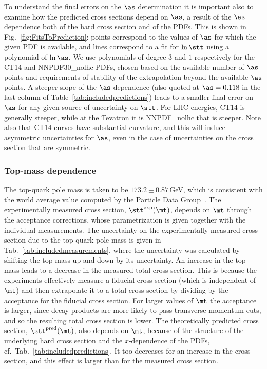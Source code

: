 To understand the final errors on the $\as$ determination it is
important also to examine how the predicted cross sections depend on
$\as$, a result of the $\as$ dependence both of the hard cross section
and of the PDFs.
%
This is shown in Fig.~\ref{fig:FitsToPrediction}: points correspond
to the values of $\as$ for which the given PDF is available, and lines
correspond to a fit for $\ln \stt$ using a polynomial of $\ln \as$. 
%
We use polynomials of degree $3$ and $1$ respectively for the CT14 and
NNPDF30\_nolhc PDFs, chosen based on the available number of $\as$ points and
requirements of stability of the extrapolation beyond the available
$\as$ points.
%
A steeper slope of the $\as$ dependence (also quoted at $\as=0.118$ in
the last column of Table~\ref{tab:includedpredictions})
leads to a smaller final error on $\as$ for any given source of
uncertainty on $\stt$. 
%
For LHC energies, CT14 is generally steeper, while at the Tevatron
it is NNPDF\_nolhc that is steeper.
%
Note also that CT14 curves have substantial curvature, and this will
induce asymmetric uncertainties for $\as$, even in the case of
uncertainties on the cross section that are symmetric.



\subsubsection{Top-mass dependence}
\label{sec:top-mass-dependence}

The top-quark pole mass is taken to be $173.2 \pm 0.87\,$GeV, which
is consistent with the world average value computed by the Particle Data
Group~\cite{pdg}. 
% 
% 
The experimentally measured cross section, $\stt^{\text{exp}} (\mt)$,
depends on $\mt$ through the acceptance corrections, whose
parametrization is given together with the individual
measurements.
% 
The uncertainty on the experimentally measured cross section due to the top-quark pole mass is given in Tab.~\ref{tab:includedmeasurements}, where the uncertainty was calculated by shifting the top mass up and down by its uncertainty.
% 
An increase in the top mass leads to a decrease in the measured total
cross section.
%
This is because the experiments effectively measure a fiducial cross
section (which is independent of $\mt$) and then extrapolate it to a
total cross section by dividing by the acceptance for the fiducial
cross section.
%
For larger values of $\mt$ the acceptance is larger, since decay
products are more likely to pass transverse momentum cuts, and so the resulting
total cross section is lower.
% 
The theoretically predicted cross section,
$\stt^{\text{pred}} ( \mt )$, also depends on $\mt$, because of the
structure of the underlying hard cross section and the $x$-dependence
of the PDFs, cf.\ Tab.~\ref{tab:includedpredictions}.
%
It too decreases for an increase in the cross section, and this
effect is larger than for the measured cross section.

